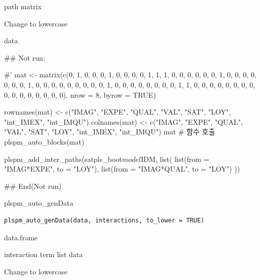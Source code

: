\documentclass[a4paper]{book}
\begin{document}
%
\begin{Arguments}
\begin{ldescription}
\item[\code{mat}] path matrix

\item[\code{to\_lower}] Change to lowercase
\end{ldescription}
\end{Arguments}
%
\begin{Value}
data
\end{Value}
%
\begin{Examples}
\begin{ExampleCode}


## Not run: 

#'
mat <- matrix(c(0, 1, 0, 0, 0, 1, 0, 0,
                0, 0, 1, 1, 1, 0, 0, 0,
                0, 0, 0, 1, 0, 0, 0, 0,
                0, 0, 0, 1, 0, 0, 0, 0,
                0, 0, 0, 0, 0, 1, 0, 0,
                0, 0, 0, 0, 0, 0, 1, 1,
                0, 0, 0, 0, 0, 0, 0, 0,
                0, 0, 0, 0, 0, 0, 0, 0),
              nrow = 8, byrow = TRUE)

rownames(mat) <- c("IMAG", "EXPE", "QUAL", "VAL", "SAT", "LOY", "int_IMEX", "int_IMQU")
colnames(mat) <- c("IMAG", "EXPE", "QUAL", "VAL", "SAT", "LOY", "int_IMEX", "int_IMQU")
mat
# 함수 호출
plspm_auto_blocks(mat)

plspm_add_inter_paths(satpls_boot$model$IDM, list(
  list(from = "IMAG*EXPE", to = "LOY"),
  list(from = "IMAG*QUAL", to = "LOY")
))%


## End(Not run)

\end{ExampleCode}
\end{Examples}
%
\begin{Description}
plspm\_auto\_genData
\end{Description}
%
\begin{Usage}
\begin{verbatim}
plspm_auto_genData(data, interactions, to_lower = TRUE)
\end{verbatim}
\end{Usage}
%
\begin{Arguments}
\begin{ldescription}
\item[\code{data}] data.frame

\item[\code{interactions}] interaction term list data

\item[\code{to\_lower}] Change to lowercase
\end{ldescription}
\end{Arguments}
\end{document}
